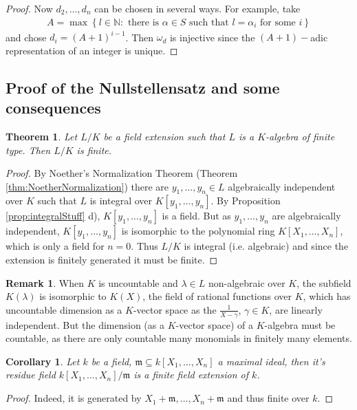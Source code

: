 \documentclass[DIV=14,parskip=half]{scrartcl}
\newtheorem{thm}{Theorem}[subsection]
\newtheorem{cor}{Corollary}[subsection]
\theoremstyle{definition}
\newtheorem{rem}{Remark}[subsection]
\newcommand{\N}{\mathbb{N}}
\begin{document}
\begin{proof}
Now $d_2,\ldots,d_n$ can be chosen in several ways. For example, take
\begin{align*}
 A = \max\left\{l\in\N: \text{ there is }\alpha\in S \text{ such that } l =\alpha_i \text{ for some } i\right\}
\end{align*}
and chose $d_i = (A+1)^{i-1}$. Then $\omega_d$ is injective since the $(A+1)-$adic representation of an integer is unique.
 \end{proof}


\subsection{Proof of the Nullstellensatz and some consequences}\label{sec:ProofNullstellensatz}
\begin{thm}\label{thm:fieldExtensionOfFiniteTypeIsFinite}
 Let $L/K$ be a field extension such that $L$ is a $K$-algebra of finite type. Then $L/K$ is finite.
\end{thm}
\begin{proof}
By Noether's Normalization Theorem (Theorem \ref{thm:NoetherNormalization})  there are $y_1, \ldots, y_n\in L$ algebraically independent over $K$ such that $L$ is integral over $K[y_1,\ldots,y_n]$. By Proposition \ref{prop:integralStuff} d), $K[y_1,\ldots,y_n]$ is a field. But as $y_1,\ldots, y_n$ are algebraically independent, $K[y_1,\ldots, y_n]$ is isomorphic to the polynomial ring $K[X_1,\ldots,X_n]$, which is only a field for $n=0$. Thus $L/K$ is integral (i.e. algebraic) and since the extension is finitely generated it must be finite. 
\end{proof}
\begin{rem}
 When $K$ is uncountable and $\lambda\in L$ non-algebraic over $K$, the subfield $K(\lambda)$ is isomorphic to $K(X)$, the field of rational functions over $K$, which has uncountable dimension as a $K$-vector space as the $\frac{1}{X-\gamma}$, $\gamma\in K$, are linearly independent. But the dimension (as a $K$-vector space) of a $K$-algebra must be countable, as there are only countable many monomials in finitely many elements.
\end{rem}
\begin{cor}
 Let $k$ be a field, $\mathfrak{m}\subseteq k[X_1,\ldots,X_n]$ a maximal ideal, then it's residue field $k[X_1,\ldots,X_n]/\mathfrak{m}$ is a finite field extension of $k$.
\end{cor}
\begin{proof}
 Indeed, it is generated by $X_1+\mathfrak{m},\ldots, X_n+\mathfrak{m}$ and thus finite over $k$.
\end{proof}
\end{document}
